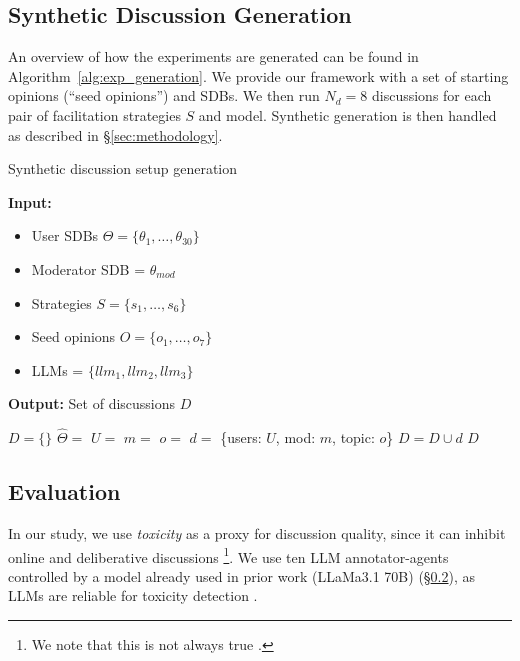 \subsection{Synthetic Discussion Generation}
\label{ssec:appendix:discussion}

An overview of how the experiments are generated can be found in Algorithm~\ref{alg:exp_generation}. We provide our framework with a set of starting opinions (``seed opinions'') and SDBs. We then run $N_d=8$ discussions for each pair of facilitation strategies $S$ and model. Synthetic generation is then handled as described in \S\ref{sec:methodology}. 

\begin{algorithm}[ht]
	\caption{Synthetic discussion setup generation}
	\label{alg:exp_generation}
	\hspace*{\algorithmicindent} \textbf{Input:} 
	\begin{itemize}[noitemsep, nosep]
		\item User SDBs $\Theta = \{\theta_1, \dots, \theta_{30}\}$
		\item Moderator SDB = $\theta_{mod}$
		\item Strategies $S = \{s_1, \ldots, s_6\}$
		\item Seed opinions $O = \{o_1, \ldots, o_7\}$
		\item LLMs = $\{llm_1, llm_2, llm_3\}$
	\end{itemize}
	\hspace*{\algorithmicindent} \textbf{Output:} Set of discussions $D$
	\begin{algorithmic}[1]
		\State $D = \{\}$
		\State $\hat{\Theta} = $ 
		\State $U =$  
		\State $m = $ 
		\State $o = $ 
		\State $d =$ \{users: $U$, mod: $m$, topic: $o$\}
		\State $D = D \cup d$
		\EndFor
		\EndFor
		\EndFor
		\State \Return $D$
	\end{algorithmic}
\end{algorithm}


\subsection{Evaluation}
\label{ssec:experimental:evaluation}

In our study, we use \emph{toxicity} as a proxy for discussion quality, since it can inhibit online and deliberative discussions \citep{dekock2022disagree, XiaToxicity}\footnote{We note that this is not always true \citep{Avalle2024PersistentIP}.}. We use ten LLM annotator-agents controlled by a model already used in prior work (LLaMa3.1 70B) \cite{kang-qian-2024-implanting} (\S\ref{ssec:experimental:evaluation}), as LLMs are reliable for toxicity detection \citep{kang-qian-2024-implanting, Wang2022ToxicityDW, anjum2024hate}.

